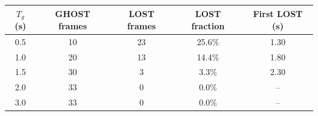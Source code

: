 \begin{tabular}{c c c c c}
\toprule
\textbf{$T_g$ (s)} & \textbf{GHOST frames} & \textbf{LOST frames} & \textbf{LOST fraction} & \textbf{First LOST (s)} \\
\midrule
0.5 & 10 & 23 & 25.6\% & 1.30 \\
1.0 & 20 & 13 & 14.4\% & 1.80 \\
1.5 & 30 & 3 & 3.3\% & 2.30 \\
2.0 & 33 & 0 & 0.0\% & -- \\
3.0 & 33 & 0 & 0.0\% & -- \\
\bottomrule
\end{tabular}
